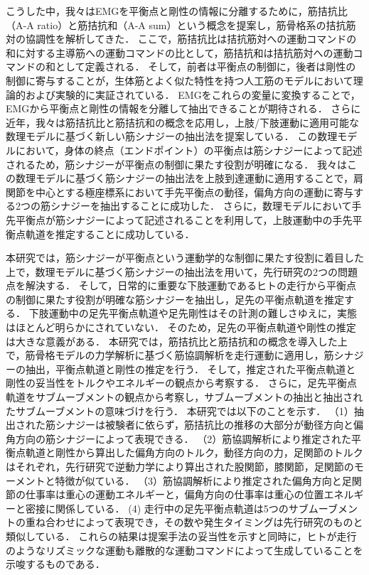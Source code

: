 こうした中，我々はEMGを平衡点と剛性の情報に分離するために，筋拮抗比（A-A ratio）と筋拮抗和（A-A sum）という概念を提案し，筋骨格系の拮抗筋対の協調性を解析してきた\cite{Hirai2010,Iimura2011,Inoue2012,Ariga2013,Uno2014}．
ここで，筋拮抗比は拮抗筋対への運動コマンドの和に対する主導筋への運動コマンドの比として，筋拮抗和は拮抗筋対への運動コマンドの和として定義される．
そして，前者は平衡点の制御に，後者は剛性の制御に寄与することが，生体筋とよく似た特性を持つ人工筋のモデルにおいて理論的および実験的に実証されている\cite{Ariga2013}．
EMGをこれらの変量に変換することで，EMGから平衡点と剛性の情報を分離して抽出できることが期待される．
さらに近年，我々は筋拮抗比と筋拮抗和の概念を応用し，上肢/下肢運動に適用可能な数理モデルに基づく新しい筋シナジーの抽出法を提案している\cite{Uno2014}．
この数理モデルにおいて，身体の終点（エンドポイント）の平衡点は筋シナジーによって記述されるため，筋シナジーが平衡点の制御に果たす役割が明確になる．
我々はこの数理モデルに基づく筋シナジーの抽出法を上肢到達運動に適用することで，肩関節を中心とする極座標系において手先平衡点の動径，偏角方向の運動に寄与する2つの筋シナジーを抽出することに成功した\cite{Uno2014}．
さらに，数理モデルにおいて手先平衡点が筋シナジーによって記述されることを利用して，上肢運動中の手先平衡点軌道を推定することに成功している．

本研究では，筋シナジーが平衡点という運動学的な制御に果たす役割に着目した上で，数理モデルに基づく筋シナジーの抽出法を用いて，先行研究の2つの問題点を解決する．
そして，日常的に重要な下肢運動であるヒトの走行から平衡点の制御に果たす役割が明確な筋シナジーを抽出し，足先の平衡点軌道を推定する．
下肢運動中の足先平衡点軌道や足先剛性はその計測の難しさゆえに，実態はほとんど明らかにされていない．
そのため，足先の平衡点軌道や剛性の推定は大きな意義がある．
本研究では，筋拮抗比と筋拮抗和の概念を導入した上で，筋骨格モデルの力学解析に基づく筋協調解析を走行運動に適用し，筋シナジーの抽出，平衡点軌道と剛性の推定を行う．
そして，推定された平衡点軌道と剛性の妥当性をトルクやエネルギーの観点から考察する．
さらに，足先平衡点軌道をサブムーブメントの観点から考察し，サブムーブメントの抽出と抽出されたサブムーブメントの意味づけを行う．
本研究では以下のことを示す．
（1）抽出された筋シナジーは被験者に依らず，筋拮抗比の推移の大部分が動径方向と偏角方向の筋シナジーによって表現できる．
（2）筋協調解析により推定された平衡点軌道と剛性から算出した偏角方向のトルク，動径方向の力，足関節のトルクはそれぞれ，先行研究で逆動力学により算出された股関節，膝関節，足関節のモーメントと特徴が似ている．
（3）筋協調解析により推定された偏角方向と足関節の仕事率は重心の運動エネルギーと，偏角方向の仕事率は重心の位置エネルギーと密接に関係している．
 (4) 走行中の足先平衡点軌道は5つのサブムーブメントの重ね合わせによって表現でき，その数や発生タイミングは先行研究のものと類似している．
これらの結果は提案手法の妥当性を示すと同時に，ヒトが走行のようなリズミックな運動も離散的な運動コマンドによって生成していることを示唆するものである．

